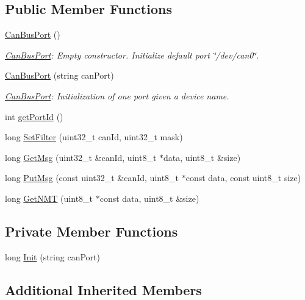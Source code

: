 \subsection*{Public Member Functions}
\begin{DoxyCompactItemize}
\item 
\hyperlink{classCanBusPort_a4ccb8d39da6185bfe5c1dee38db51987}{Can\+Bus\+Port} ()
\begin{DoxyCompactList}\small\item\em \hyperlink{classCanBusPort}{Can\+Bus\+Port}\+: Empty constructor. Initialize default port \char`\"{}/dev/can0\char`\"{}. \end{DoxyCompactList}\item 
\hyperlink{classCanBusPort_ad4649a2da594bbffc267483646fb1405}{Can\+Bus\+Port} (string can\+Port)
\begin{DoxyCompactList}\small\item\em \hyperlink{classCanBusPort}{Can\+Bus\+Port}\+: Initialization of one port given a device name. \end{DoxyCompactList}\item 
int \hyperlink{classCanBusPort_a7c6b733c5834d4ab3e1906d847a2234a}{get\+Port\+Id} ()
\item 
long \hyperlink{classCanBusPort_af09c794e3af86e89c8a511535f856dc9}{Set\+Filter} (uint32\+\_\+t can\+Id, uint32\+\_\+t mask)
\item 
long \hyperlink{classCanBusPort_ac442e4e5b7bb154ea6322518b715f406}{Get\+Msg} (uint32\+\_\+t \&can\+Id, uint8\+\_\+t $\ast$data, uint8\+\_\+t \&size)
\item 
long \hyperlink{classCanBusPort_a2bb802ad7a14e260f0f51b79d4c53c43}{Put\+Msg} (const uint32\+\_\+t \&can\+Id, uint8\+\_\+t $\ast$const data, const uint8\+\_\+t size)
\item 
long \hyperlink{classCanBusPort_a41242dc7980ca398e4770813e50ef32b}{Get\+N\+MT} (uint8\+\_\+t $\ast$const data, uint8\+\_\+t \&size)
\end{DoxyCompactItemize}
\subsection*{Private Member Functions}
\begin{DoxyCompactItemize}
\item 
long \hyperlink{classCanBusPort_a0de0778cfc475d2da559668be55f6015}{Init} (string can\+Port)
\end{DoxyCompactItemize}
\subsection*{Additional Inherited Members}


